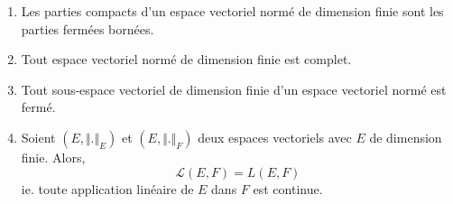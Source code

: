   \begin{corollary}
    \label{autour-de-la-compacite-5}
    \begin{enumerate}[label=(\roman*)]
      \item \label{autour-de-la-compacite-5-1} Les parties compacts d'un espace vectoriel normé de dimension finie sont les parties fermées bornées.
      \item \label{autour-de-la-compacite-5-2} Tout espace vectoriel normé de dimension finie est complet.
      \item Tout sous-espace vectoriel de dimension finie d'un espace vectoriel normé est fermé.
      \item Soient $(E, \Vert . \Vert_E)$ et $(E, \Vert . \Vert_F)$ deux espaces vectoriels avec $E$ de dimension finie. Alors,
      \[ \mathcal{L}(E, F) = L(E,F) \]
      ie. toute application linéaire de $E$ dans $F$ est continue.
    \end{enumerate}
  \end{corollary}

